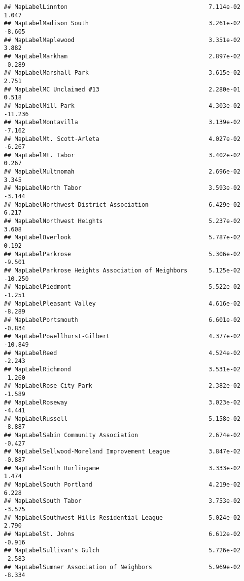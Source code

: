 \documentclass[]{article}
\begin{document}
\begin{verbatim}
## MapLabelLinnton                                        7.114e-02   1.047
## MapLabelMadison South                                  3.261e-02  -8.605
## MapLabelMaplewood                                      3.351e-02   3.882
## MapLabelMarkham                                        2.897e-02  -0.289
## MapLabelMarshall Park                                  3.615e-02   2.751
## MapLabelMC Unclaimed #13                               2.280e-01   0.518
## MapLabelMill Park                                      4.303e-02 -11.236
## MapLabelMontavilla                                     3.139e-02  -7.162
## MapLabelMt. Scott-Arleta                               4.027e-02  -6.267
## MapLabelMt. Tabor                                      3.402e-02   0.267
## MapLabelMultnomah                                      2.696e-02   3.345
## MapLabelNorth Tabor                                    3.593e-02  -3.144
## MapLabelNorthwest District Association                 6.429e-02   6.217
## MapLabelNorthwest Heights                              5.237e-02   3.608
## MapLabelOverlook                                       5.787e-02   0.192
## MapLabelParkrose                                       5.306e-02  -9.501
## MapLabelParkrose Heights Association of Neighbors      5.125e-02 -10.250
## MapLabelPiedmont                                       5.522e-02  -1.251
## MapLabelPleasant Valley                                4.616e-02  -8.289
## MapLabelPortsmouth                                     6.601e-02  -0.834
## MapLabelPowellhurst-Gilbert                            4.377e-02 -10.849
## MapLabelReed                                           4.524e-02  -2.243
## MapLabelRichmond                                       3.531e-02  -1.260
## MapLabelRose City Park                                 2.382e-02  -1.589
## MapLabelRoseway                                        3.023e-02  -4.441
## MapLabelRussell                                        5.158e-02  -8.887
## MapLabelSabin Community Association                    2.674e-02  -0.427
## MapLabelSellwood-Moreland Improvement League           3.847e-02  -0.887
## MapLabelSouth Burlingame                               3.333e-02   1.474
## MapLabelSouth Portland                                 4.219e-02   6.228
## MapLabelSouth Tabor                                    3.753e-02  -3.575
## MapLabelSouthwest Hills Residential League             5.024e-02   2.790
## MapLabelSt. Johns                                      6.612e-02  -0.916
## MapLabelSullivan's Gulch                               5.726e-02  -2.583
## MapLabelSumner Association of Neighbors                5.969e-02  -8.334

\end{verbatim}
\end{document}
